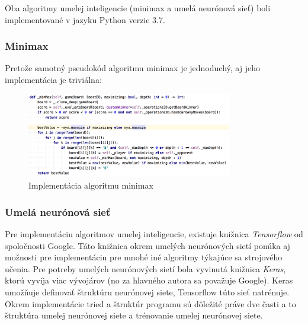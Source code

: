 Oba algoritmy umelej inteligencie (minimax a umelá neurónová sieť) boli implementované v jazyku Python verzie 3.7.

\subsubsection{Minimax}

Pretože samotný pseudokód algoritmu minimax je jednoduchý, aj jeho implementácia je triviálna:
\begin{figure}[H]
    \centering
    \includegraphics[width=0.8\textwidth]{images/impl-minimax.jpg}
    \caption{Implementácia algoritmu minimax}
\end{figure}\label{figure:minimax-impl}

\subsubsection{Umelá neurónová sieť}

Pre implementáciu algoritmov umelej inteligencie, existuje knižnica \emph{Tensorflow}\cite{tensorflow} od spoločnosti
Google.
Táto knižnica okrem umelých neurónových sietí ponúka aj možnosti pre implementáciu pre mnohé iné algoritmy týkajúce sa
strojového učenia.
Pre potreby umelých neurónových sietí bola vyvinutá knižnica \emph{Keras}\cite{keras}, ktorú vyvíja viac vývojárov
(no za hlavného autora sa považuje Google).
Keras umožňuje definovať štruktúru neurónovej siete, Tensorflow túto sieť natrénuje.
Okrem implementácie tried a štruktúr programu sú dôležité práve dve časti a to štruktúra umelej neurónovej siete a
trénovanie umelej neurónovej siete.


